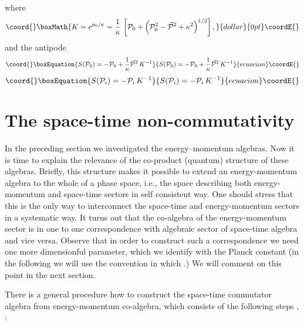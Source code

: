 \documentclass[a4paper,a4paper]{article}
\begin{document}
where
$$\coord{}\boxMath{
K = e^{p_0/\kappa} = \frac1\kappa\, \left[ {\cal P}_{0} + \left(
{\cal P}_{0}^2 - \vec{{\cal P}}{}^2  +
\kappa^2\right)^{1/2}\right],
}{dollar}{0pt}\coordE{}$$
and the antipode
\begin{equation}\coord{}\boxEquation{\label{15s1}
    S({\cal P}_{0})=-{\cal P}_{0} + \frac1\kappa\vec{{\cal
    P}}{}^2\, K^{-1}
}{S({\cal P}_{0})=-{\cal P}_{0} + \frac1\kappa\vec{{\cal
    P}}{}^2\, K^{-1}
}{ecuacion}\coordE{}\end{equation}
\begin{equation}\coord{}\boxEquation{\label{15s2}
  S({\cal P}_{i})=-{\cal P}_{i}\, K^{-1}
}{S({\cal P}_{i})=-{\cal P}_{i}\, K^{-1}
}{ecuacion}\coordE{}\end{equation}

\section{The space-time non-commutativity}

In the preceding section we investigated the energy--momentum
algebras. Now it is time to explain the  relevance of the
co-product (quantum) structure of these algebras. Briefly, this
structure makes it possible to extend an energy-momentum algebra
to the whole of a phase space, i.e., the space describing both
energy-momentum and space-time sectors in self consistent way. One
should stress that this is the only way to interconnect the
space-time and energy-momentum sectors in a systematic way. It
turns out that the co-algebra  of the energy-momentum sector is in
one to one correspondence with algebraic sector of space-time
algebra and vice versa. Observe that in order to construct such a
correspondence we need one more dimensionful parameter, which we
identify with the Planck constant (in the following we will use
the convention in which \coordHE{}.) We will comment on this point
in the next section.

There is a  general procedure how to construct the space-time
commutator algebra from energy-momentum  co-algebra, which
consists of the following steps \cite{maru}, \cite{crossalg}:
\end{document}
